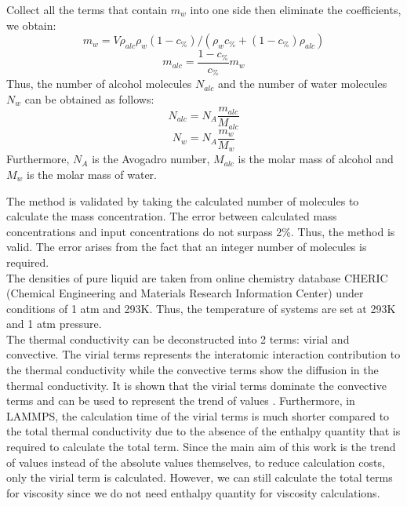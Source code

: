 Collect all the terms that contain $m_w$ into one side then eliminate the coefficients, we obtain:
\begin{equation}
    m_{w}=V \rho_{a l c} \rho_{w}\left(1-c_{\%}\right) /\left(\rho_{w} c_{\%}+\left(1-c_{\%}\right) \rho_{a l c}\right)
\end{equation}
\begin{equation}
    m_{a l c}=\frac{1-c_{\%}}{c_{\%}} m_{w}
\end{equation}
Thus, the number of alcohol molecules $N_{alc}$ and the number of water molecules $N_w$
can be obtained as follows:
\begin{equation}
    N_{a l c}=N_{A} \frac{m_{a l c}}{M_{a l c}}
\end{equation}
\begin{equation}
    N_{w}=N_{A} \frac{m_{w}}{M_{w}}
\end{equation}
Furthermore, $N_A$ is the Avogadro number, $M_{alc}$ is the molar mass of alcohol and 
$M_w$ is the molar mass of water.

The method is validated by taking the calculated number of molecules to 
calculate the mass concentration. The error between calculated mass 
concentrations and input concentrations do not surpass 2\%. Thus, the method 
is valid. The error arises from the fact that an integer number of molecules 
is required.\\
The densities of pure liquid are taken from online chemistry database CHERIC 
(Chemical Engineering and Materials Research Information Center) under 
conditions of 1 atm and 293K. Thus, the temperature of systems are set at 
293K and 1 atm pressure.\\
The thermal conductivity can be deconstructed into 2 terms: virial and 
convective. The virial terms represents the interatomic interaction 
contribution to the thermal conductivity while the convective terms show the 
diffusion in the thermal conductivity. It is shown that the virial terms 
dominate the convective terms and can be used to represent the trend of 
values \cite{lin_constructing_2011}. Furthermore, in LAMMPS, the calculation time of 
the virial terms is much shorter compared to the total thermal conductivity 
due to the absence of the enthalpy quantity that is required to calculate the 
total term. Since the main aim of this work is the trend of values instead of 
the absolute values themselves, to reduce calculation costs, only the virial 
term is calculated. However, we can still calculate the total terms for 
viscosity since we do not need enthalpy quantity for viscosity calculations.

